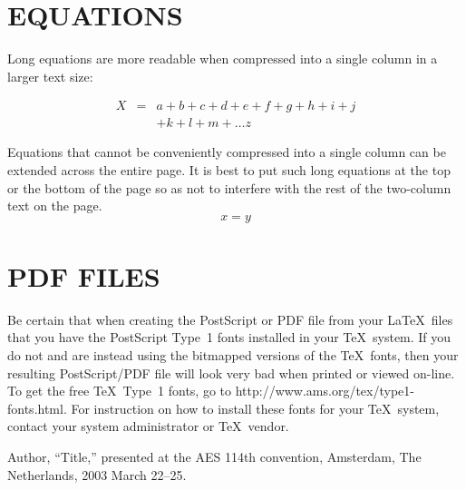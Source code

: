 \documentclass{aes130}
\begin{document}
\section{EQUATIONS}
Long equations are more readable when compressed into a single column
in a larger text size:
\begin{large}
\begin{eqnarray*}
X &=& a + b + c + d + e + f + g + h + i + j \\
  &&    + k  + l + m + \dots z
\end{eqnarray*}%
\end{large}%
Equations that cannot be conveniently compressed into a single column
can be extended across the entire page. It is best to put such long
equations at the top or the bottom of the page so as not to interfere
with the rest of the two-column text on the page.
\begin{equation}
x=y
\end{equation}

\section{PDF FILES}
Be certain that when creating the PostScript or PDF file from your
\LaTeX\ files that you have the PostScript Type~1 fonts installed in
your \TeX\ system. If you do not and are instead using the bitmapped
versions of the \TeX\ fonts, then your resulting PostScript/PDF file
will look very bad when printed or viewed on-line. To get the free
\TeX\ Type~1 fonts, go to 
http://www.ams.org/tex/type1-fonts.html. 
For instruction on how to install these fonts for your \TeX\ system,
contact your system administrator or \TeX\ vendor. 


\begin{thebibliography}{99}

Author, ``Title,'' presented at the AES 114th convention, 
Amsterdam, The Netherlands, 2003 March 22--25. 

%
%
%
\end{thebibliography}
\end{document}
